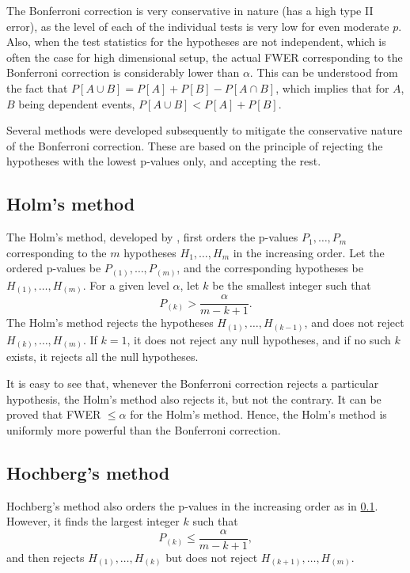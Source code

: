 \documentclass[
]{book}
\begin{document}
The Bonferroni correction is very conservative in nature (has a high type II error), as the level of each of the individual tests is very low for even moderate \(p\). Also, when the test statistics for the hypotheses are not independent, which is often the case for high dimensional setup, the actual FWER corresponding to the Bonferroni correction is considerably lower than \(\alpha\). This can be understood from the fact that \(P[A \cup B] = P[A] + P[B] - P[A \cap B]\), which implies that for \(A\), \(B\) being dependent events, \(P[A \cup B] < P[A] + P[B]\).

Several methods were developed subsequently to mitigate the conservative nature of the Bonferroni correction. These are based on the principle of rejecting the hypotheses with the lowest p-values only, and accepting the rest.

\hypertarget{holm}{%
\subsection{Holm's method}\label{holm}}

The Holm's method, developed by \citet{holm1979simple}, first orders the p-values \(P_1, \ldots, P_m\) corresponding to the \(m\) hypotheses \(H_1, \ldots, H_m\) in the increasing order. Let the ordered p-values be \(P_{(1)}, \ldots, P_{(m)}\), and the corresponding hypotheses be \(H_{(1)}, \ldots, H_{(m)}\). For a given level \(\alpha\), let \(k\) be the smallest integer such that \[P_{(k)} > \frac{\alpha}{m - k + 1}.\] The Holm's method rejects the hypotheses \(H_{(1)}, \ldots, H_{(k-1)}\), and does not reject \(H_{(k)}, \ldots, H_{(m)}\). If \(k = 1\), it does not reject any null hypotheses, and if no such \(k\) exists, it rejects all the null hypotheses.

It is easy to see that, whenever the Bonferroni correction rejects a particular hypothesis, the Holm's method also rejects it, but not the contrary. It can be proved that FWER \(\le \alpha\) for the Holm's method. Hence, the Holm's method is uniformly more powerful than the Bonferroni correction.

\hypertarget{hochberg}{%
\subsection{Hochberg's method}\label{hochberg}}

Hochberg's method \citep{hochberg1988sharper} also orders the p-values in the increasing order as in \ref{holm}. However, it finds the largest integer \(k\) such that \[P_{(k)} \le \frac{\alpha}{m - k + 1},\] and then rejects \(H_{(1)}, \ldots, H_{(k)}\) but does not reject \(H_{(k+1)}, \ldots, H_{(m)}\).
\end{document}
